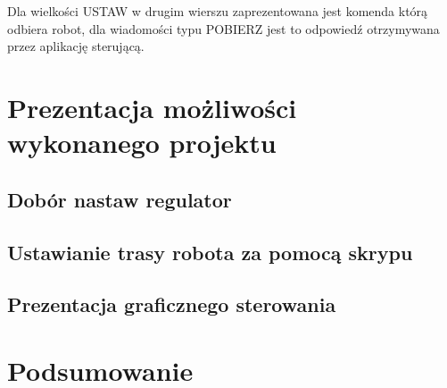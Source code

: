 \documentclass[eng,printmode]{mgr}
\begin{document}
Dla wielkości USTAW w drugim wierszu zaprezentowana jest komenda którą odbiera robot, dla wiadomości typu POBIERZ jest to odpowiedź otrzymywana przez aplikację sterującą.
  
  \chapter{Prezentacja możliwości wykonanego projektu}

 \section{Dobór nastaw regulator}
 \section{Ustawianie trasy robota za pomocą skrypu}
 \section{Prezentacja graficznego sterowania}

\chapter{Podsumowanie}

\end{document}

